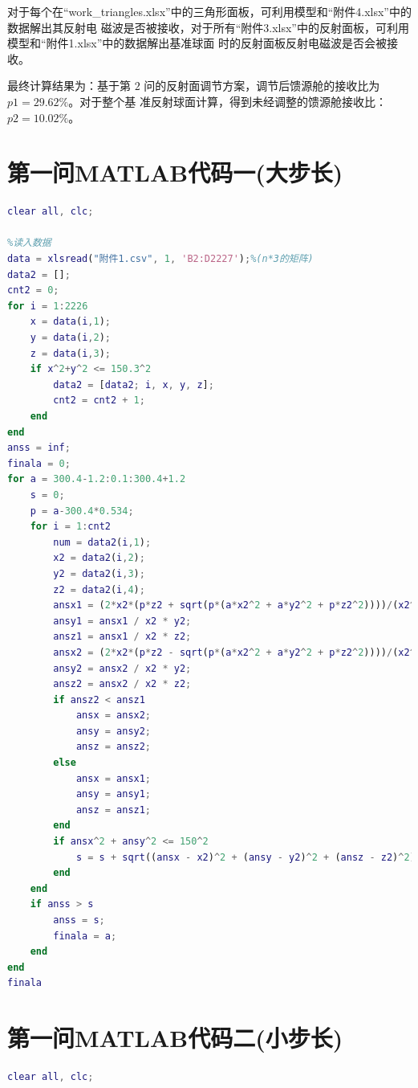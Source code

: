 \documentclass[withoutpreface,bwprint]{cumcmthesis} %
\begin{document}
对于每个在“work\_triangles.xlsx”中的三角形面板，可利用模型和“附件4.xlsx”中的数据解出其反射电
磁波是否被接收，对于所有“附件3.xlsx”中的反射面板，可利用模型和“附件1.xlsx”中的数据解出基准球面
时的反射面板反射电磁波是否会被接收。

最终计算结果为：基于第 $2$ 问的反射面调节方案，调节后馈源舱的接收比为 $p1 = 29.62\%$。对于整个基
准反射球面计算，得到未经调整的馈源舱接收比：$p2 = 10.02\%$。

\begin{appendices}
\section{第一问MATLAB代码一(大步长)}
\begin{lstlisting}[language=matlab]
clear all, clc;

%读入数据
data = xlsread("附件1.csv", 1, 'B2:D2227');%(n*3的矩阵)
data2 = [];
cnt2 = 0;
for i = 1:2226
    x = data(i,1);
    y = data(i,2);
    z = data(i,3);
    if x^2+y^2 <= 150.3^2
        data2 = [data2; i, x, y, z];
        cnt2 = cnt2 + 1;
    end
end
anss = inf;
finala = 0;
for a = 300.4-1.2:0.1:300.4+1.2
    s = 0;
    p = a-300.4*0.534;
    for i = 1:cnt2
        num = data2(i,1);
        x2 = data2(i,2);
        y2 = data2(i,3);
        z2 = data2(i,4);
        ansx1 = (2*x2*(p*z2 + sqrt(p*(a*x2^2 + a*y2^2 + p*z2^2))))/(x2^2 + y2^2); 
        ansy1 = ansx1 / x2 * y2;
        ansz1 = ansx1 / x2 * z2;
        ansx2 = (2*x2*(p*z2 - sqrt(p*(a*x2^2 + a*y2^2 + p*z2^2))))/(x2^2 + y2^2);
        ansy2 = ansx2 / x2 * y2;
        ansz2 = ansx2 / x2 * z2;
        if ansz2 < ansz1
            ansx = ansx2;
            ansy = ansy2;
            ansz = ansz2;
        else
            ansx = ansx1;
            ansy = ansy1;
            ansz = ansz1;
        end
        if ansx^2 + ansy^2 <= 150^2
            s = s + sqrt((ansx - x2)^2 + (ansy - y2)^2 + (ansz - z2)^2);
        end
    end
    if anss > s
        anss = s;
        finala = a;
    end
end
finala

\end{lstlisting}
\section{第一问MATLAB代码二(小步长)}
\begin{lstlisting}[language=matlab]
clear all, clc;


\end{lstlisting}
\end{appendices}
\end{document}
